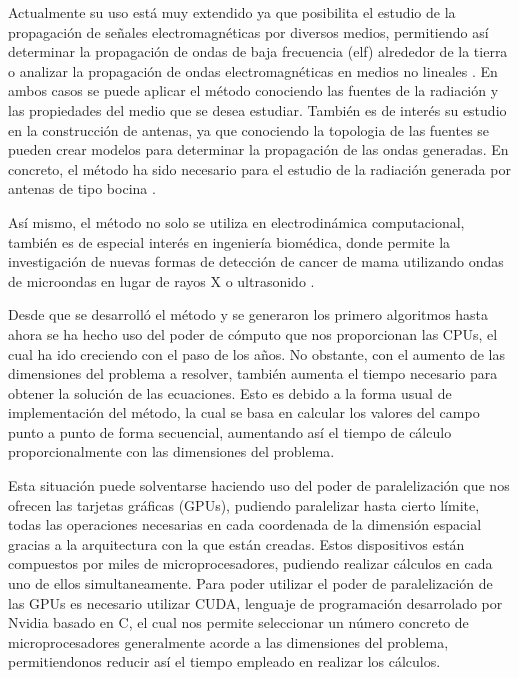 \documentclass[11pt,a4paper,twoside,pdf]{article}
\numberwithin{equation}{section}
\begin{document}
Actualmente su uso está muy extendido ya que posibilita el estudio de la propagación de señales electromagnéticas por diversos medios, permitiendo así determinar la propagación de ondas de baja frecuencia (elf) alrededor de la tierra \cite{Taflove2002} o analizar la propagación de ondas electromagnéticas en medios no lineales \cite{Goorjian1991}. En ambos casos se puede aplicar el método conociendo las fuentes de la radiación y las propiedades del medio que se desea estudiar. También es de interés su estudio en la construcción de antenas, ya que conociendo la topologia de las fuentes se pueden crear modelos para determinar la propagación de las ondas generadas. En concreto, el método ha sido necesario para el estudio de la radiación generada por antenas de tipo bocina \cite{Taflove1991}.

Así mismo, el método no solo se utiliza en electrodinámica computacional, también es de especial interés en ingeniería biomédica, donde permite la investigación de nuevas formas de detección de cancer de mama utilizando ondas de microondas en lugar de rayos X o ultrasonido \cite{Taflove1998}.

Desde que se desarrolló el método y se generaron los primero algoritmos hasta ahora se ha hecho uso del poder de cómputo que nos proporcionan las CPUs, el cual ha ido creciendo con el paso de los años. No obstante, con el aumento de las dimensiones del problema a resolver, también aumenta el tiempo necesario para obtener la solución de las ecuaciones. Esto es debido a la forma usual de implementación del método, la cual se basa en calcular los valores del campo punto a punto de forma secuencial, aumentando así el tiempo de cálculo proporcionalmente con las dimensiones del problema.

  Esta situación puede solventarse haciendo uso del poder de paralelización que nos ofrecen las tarjetas gráficas (GPUs), pudiendo paralelizar hasta cierto límite, todas las operaciones necesarias en cada coordenada de la dimensión espacial gracias a la arquitectura con la que están creadas. Estos dispositivos están compuestos por miles de microprocesadores, pudiendo realizar cálculos en cada uno de ellos simultaneamente. Para poder utilizar el poder de paralelización de las GPUs es necesario utilizar CUDA, lenguaje de programación desarrolado por Nvidia basado en C, el cual nos permite seleccionar un número concreto de microprocesadores generalmente acorde a las dimensiones del problema, permitiendonos reducir así el tiempo empleado en realizar los cálculos.
\end{document}
